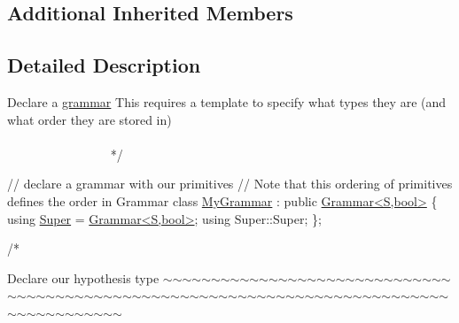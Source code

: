 \subsection*{Additional Inherited Members}


\subsection{Detailed Description}

\begin{DoxyCode}
    Declare a \hyperlink{class_l_o_t_hypothesis_affae32db28c39df676809ae47e14e7cf}{grammar}
    This requires a \textcolor{keyword}{template} to specify what types they are (and what order they are stored in)
   ~~~~~~~~~~~~~~~~~~~~~~~~~~~~~~~~~~~~~~~~~~~~~~~~~~~~~~~~~~~~~~~~~~~~~~~~~~~~~~~~~~~~~~~~ */



\textcolor{comment}{// declare a grammar with our primitives}
\textcolor{comment}{// Note that this ordering of primitives defines the order in Grammar}
\textcolor{keyword}{class }\hyperlink{class_my_grammar}{MyGrammar} : \textcolor{keyword}{public} \hyperlink{class_grammar}{Grammar<S,bool>} \{
    \textcolor{keyword}{using} \hyperlink{class_my_hypothesis_a266742f266abc638ddc1d1870d735313}{Super} = \hyperlink{class_grammar}{Grammar<S,bool>};
    \textcolor{keyword}{using} Super::Super;
\};

\textcolor{comment}{/*}
\end{DoxyCode}
 Declare our hypothesis type $\sim$$\sim$$\sim$$\sim$$\sim$$\sim$$\sim$$\sim$$\sim$$\sim$$\sim$$\sim$$\sim$$\sim$$\sim$$\sim$$\sim$$\sim$$\sim$$\sim$$\sim$$\sim$$\sim$$\sim$$\sim$$\sim$$\sim$$\sim$$\sim$$\sim$$\sim$$\sim$$\sim$$\sim$$\sim$$\sim$$\sim$$\sim$$\sim$$\sim$$\sim$$\sim$$\sim$$\sim$$\sim$$\sim$$\sim$$\sim$$\sim$$\sim$$\sim$$\sim$$\sim$$\sim$$\sim$$\sim$$\sim$$\sim$$\sim$$\sim$$\sim$$\sim$$\sim$$\sim$$\sim$$\sim$$\sim$$\sim$$\sim$$\sim$$\sim$$\sim$$\sim$$\sim$$\sim$$\sim$$\sim$$\sim$$\sim$$\sim$$\sim$$\sim$$\sim$$\sim$$\sim$$\sim$$\sim$$\sim$


